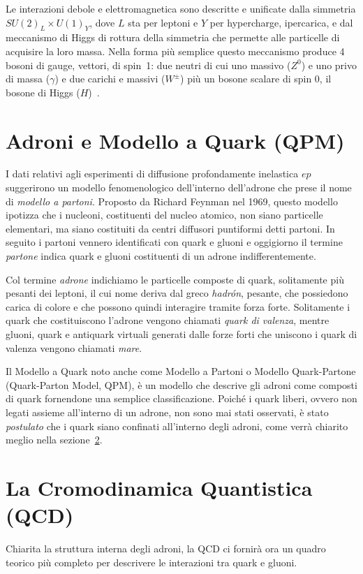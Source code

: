     Le interazioni debole e elettromagnetica sono descritte e unificate dalla simmetria $SU(2)_L \times U(1)_Y$, dove $L$ sta per leptoni e $Y$ per hypercharge, ipercarica, e dal meccanismo di Higgs di rottura della simmetria che permette alle particelle di acquisire la loro massa. Nella forma più semplice questo meccanismo produce 4 bosoni di gauge, vettori, di spin~\num{1}: due neutri di cui uno massivo ($Z^0$) e uno privo di massa ($\gamma$) e due carichi e massivi ($W^\pm$) più un bosone scalare di spin \num{0}, il bosone di Higgs ($H$)~\cite{Vitale_1995}.

\newpage

\section{Adroni e Modello a Quark (QPM)}
\label{sec:QPM}
    I dati relativi agli esperimenti di diffusione profondamente inelastica $ep$ suggerirono un modello fenomenologico dell'interno dell'adrone che prese il nome di \textit{modello a partoni}. Proposto da Richard Feynman nel 1969, questo modello ipotizza che i nucleoni, costituenti del nucleo atomico, non siano particelle elementari, ma siano costituiti da centri diffusori puntiformi detti partoni. In seguito i partoni vennero identificati con quark e gluoni e oggigiorno il termine \textit{partone} indica quark e gluoni costituenti di un adrone indifferentemente.
    
    Col termine \textit{adrone} indichiamo le particelle composte di quark, solitamente più pesanti dei leptoni, il cui nome deriva dal greco \textit{hadrón}, pesante, che possiedono carica di colore e che possono quindi interagire tramite forza forte. Solitamente i quark che costituiscono l'adrone vengono chiamati \textit{quark di valenza}, mentre gluoni, quark e antiquark virtuali generati dalle forze forti che uniscono i quark di valenza vengono chiamati \textit{mare}.

    Il Modello a Quark noto anche come Modello a Partoni o Modello Quark-Partone (Quark-Parton Model, QPM), è un modello che descrive gli adroni come composti di quark fornendone una semplice classificazione. Poiché i quark liberi, ovvero non legati assieme all'interno di un adrone, non sono mai stati osservati, è stato \textit{postulato} che i quark siano confinati all'interno degli adroni, come verrà chiarito meglio nella sezione~\ref{sec:QCD}.

\section{La Cromodinamica Quantistica (QCD)}
\label{sec:QCD}
    Chiarita la struttura interna degli adroni, la QCD ci fornirà ora un quadro teorico più completo per descrivere le interazioni tra quark e gluoni.

